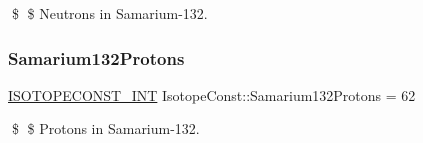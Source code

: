 \$ \$ Neutrons in Samarium-\/132. \mbox{\label{group___isotope_const-_samarium-_sm132_ga49e19e9bf465ed9c2dd2fa7c8e8bb6a2}} 
\subsubsection{\texorpdfstring{Samarium132\+Protons}{Samarium132Protons}}
{\footnotesize\ttfamily \mbox{\hyperlink{group___isotope_const-_macros_ga5f18360b3e99483a35c32d789e62621c}{I\+S\+O\+T\+O\+P\+E\+C\+O\+N\+S\+T\+\_\+\+I\+NT}} Isotope\+Const\+::\+Samarium132\+Protons = 62}

\$ \$ Protons in Samarium-\/132. 